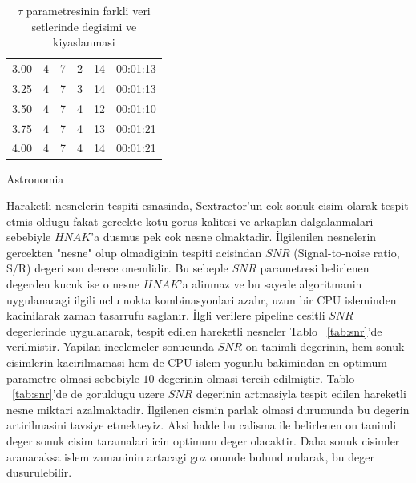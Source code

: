 \documentclass[review]{elsarticle}
\begin{document}
\begin{table}[H]
\begin{subtable}[h]{0.45\textwidth}
{\begin{tabular}{@{}cccccc@{}}
                 3.00 & 4 & 7 & 2 & 14 & 00:01:13 \\
                 3.25 & 4 & 7 & 3 & 14 & 00:01:13 \\
                 3.50 & 4 & 7 & 4 & 12 & 00:01:10 \\
                 3.75 & 4 & 7 & 4 & 13 & 00:01:21 \\
                4.00 & 4 & 7 & 4 & 14 & 00:01:21 \\
        \end{tabular}
        }
        \caption{Astronomia}
        \label{tab:astronomia_tau}
    \end{subtable}
    \caption{$\tau$ parametresinin farkli veri setlerinde degisimi ve kiyaslanmasi}
    \label{tab:tau}
\end{table}

Haraketli nesnelerin tespiti esnasinda, Sextractor'un cok sonuk cisim olarak tespit etmis oldugu fakat gercekte kotu gorus kalitesi ve arkaplan dalgalanmalari sebebiyle $HNAK$'a dusmus pek cok nesne olmaktadir. İlgilenilen nesnelerin gercekten "nesne" olup olmadiginin tespiti acisindan $SNR$ (Signal-to-noise ratio, S/R) degeri son derece onemlidir. Bu sebeple $SNR$ parametresi belirlenen degerden kucuk ise o nesne $HNAK$'a alinmaz ve bu sayede algoritmanin uygulanacagi ilgili uclu nokta kombinasyonlari azalır, uzun bir CPU isleminden kacinilarak zaman tasarrufu saglanır. İlgli verilere pipeline cesitli $SNR$ degerlerinde uygulanarak, tespit edilen hareketli nesneler Tablo ~\ref{tab:snr}'de verilmistir. Yapilan incelemeler sonucunda $SNR$ on tanimli degerinin, hem sonuk cisimlerin kacirilmamasi hem de CPU islem yogunlu bakimindan en optimum parametre olmasi sebebiyle $10$ degerinin olmasi tercih edilmiştir. Tablo ~\ref{tab:snr}'de de goruldugu uzere $SNR$ degerinin artmasiyla tespit edilen hareketli nesne miktari azalmaktadir. İlgilenen cismin parlak olmasi durumunda bu degerin artirilmasini tavsiye etmekteyiz. Aksi halde bu calisma ile belirlenen on tanimli deger sonuk cisim taramalari icin optimum deger olacaktir. Daha sonuk cisimler aranacaksa islem zamaninin artacagi goz onunde bulundurularak, bu deger dusurulebilir.
\end{document}
